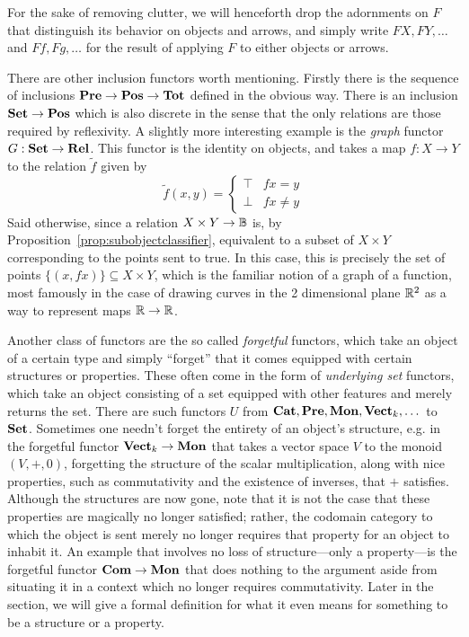 For the sake of removing clutter, we will henceforth drop the adornments on $F$ that distinguish its behavior on objects and arrows, and simply write $FX,FY,\dots$ and $Ff,Fg,\dots$ for the result of applying $F$ to either objects or arrows.

There are other inclusion functors worth mentioning. Firstly there is the sequence of inclusions $\mathbf{Pre}\to\mathbf{Pos}\to\mathbf{Tot}$ defined in the obvious way. There is an inclusion $\mathbf{Set}\to\mathbf{Pos}$ which is also discrete in the sense that the only relations are those required by reflexivity. A slightly more interesting example is the \emph{graph} functor $G:\mathbf{Set}\to\mathbf{Rel}$. This functor is the identity on objects, and takes a map $f:X\to Y$ to the relation $\tilde{f}$ given by
\[\tilde{f}(x,y) = \begin{cases}\top & fx=y \\ \bot & fx\neq y\end{cases}\]
Said otherwise, since a relation $X\times Y\to\mathbb B$ is, by Proposition~\ref{prop:subobjectclassifier}, equivalent to a subset of $X\times Y$ corresponding to the points sent to true. In this case, this is precisely the set of points $\{(x,fx)\}\subseteq X\times Y$, which is the familiar notion of a graph of a function, most famously in the case of drawing curves in the 2 dimensional plane $\mathbb R^2$ as a way to represent maps $\mathbb R\to\mathbb R$.

Another class of functors are the so called \emph{forgetful} functors, which take an object of a certain type and simply ``forget'' that it comes equipped with certain structures or properties. These often come in the form of \emph{underlying set} functors, which take an object consisting of a set equipped with other features and merely returns the set. There are such functors $U$ from $\mathbf{Cat},\mathbf{Pre},\mathbf{Mon},\mathbf{Vect}_k,\dots$ to $\mathbf{Set}$. Sometimes one needn't forget the entirety of an object's structure, e.g. in the forgetful functor $\mathbf{Vect}_k\to\mathbf{Mon}$ that takes a vector space $V$ to the monoid $(V,+,0)$, forgetting the structure of the scalar multiplication, along with nice properties, such as commutativity and the existence of inverses, that $+$ satisfies. Although the structures are now gone, note that it is not the case that these properties are magically no longer satisfied; rather, the codomain category to which the object is sent merely no longer requires that property for an object to inhabit it. An example that involves no loss of structure---only a property---is the forgetful functor $\mathbf{Com}\to\mathbf{Mon}$ that does nothing to the argument aside from situating it in a context which no longer requires commutativity. Later in the section, we will give a formal definition for what it even means for something to be a structure or a property.

